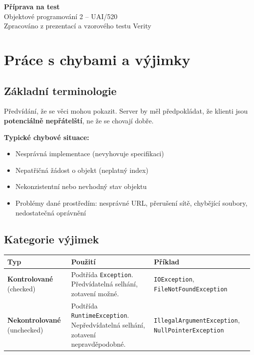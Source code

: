 \documentclass[11pt,a4paper]{article}
\begin{document}
\begin{center}
{\Huge\bfseries\color{darkblue} Příprava na test}\\[0.5em]
{\Large Objektové programování 2 -- UAI/520}\\[0.3em]
{\normalsize Zpracováno z prezentací a vzorového testu Verity}
\end{center}

\tableofcontents
\newpage

\section{Práce s chybami a výjimky}

\subsection{Základní terminologie}

\begin{tcolorbox}[defbox,title=Defenzivní programování]
Předvídání, že se věci mohou pokazit. Server by měl předpokládat, že klienti jsou \textbf{potenciálně nepřátelští}, ne že se chovají dobře.
\end{tcolorbox}

\textbf{Typické chybové situace:}
\begin{itemize}[leftmargin=*]
    \item Nesprávná implementace (nevyhovuje specifikaci)
    \item Nepatřičná žádost o objekt (neplatný index)
    \item Nekonzistentní nebo nevhodný stav objektu
    \item Problémy dané prostředím: nesprávné URL, přerušení sítě, chybějící soubory, nedostatečná oprávnění
\end{itemize}

\subsection{Kategorie výjimek}

\begin{center}
\begin{tabular}{>{\raggedright}p{3.5cm} >{\raggedright}p{5cm} >{\raggedright\arraybackslash}p{5cm}}
\toprule
\textbf{Typ} & \textbf{Použití} & \textbf{Příklad} \\
\midrule
\textbf{Kontrolované} (checked) & Podtřída \texttt{Exception}. Předvídatelná selhání, zotavení možné. & \texttt{IOException}, \texttt{FileNotFoundException} \\
\addlinespace
\textbf{Nekontrolované} (unchecked) & Podtřída \texttt{RuntimeException}. Nepředvídatelná selhání, zotavení nepravděpodobné. & \texttt{IllegalArgumentException}, \texttt{NullPointerException} \\
\bottomrule
\end{tabular}
\end{center}
\end{document}
